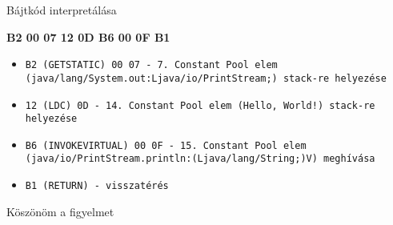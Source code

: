 \documentclass[14pt, aspectratio=169]{beamer}
\begin{document}
\begin{frame}[fragile]{Bájtkód interpretálása}

\textbf{B2 00 07 12 0D B6 00 0F B1}

\begin{itemize}
    \small \item<+->\texttt{B2 (GETSTATIC) 00 07 - 7. Constant Pool elem (java/lang/System.out:Ljava/io/PrintStream;) stack-re helyezése}
    \small \item<+->\texttt{12 (LDC) 0D - 14. Constant Pool elem (Hello, World!) stack-re helyezése}
    \small \item<+->\texttt{B6 (INVOKEVIRTUAL) 00 0F - 15. Constant Pool elem (java/io/PrintStream.println:(Ljava/lang/String;)V) meghívása}
    \small \item<+->\texttt{B1 (RETURN) - visszatérés}
\end{itemize}

\end{frame}

\begin{frame}{Köszönöm a figyelmet}

\end{frame}
\end{document}
